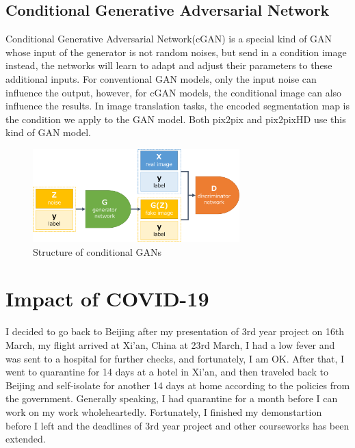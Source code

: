 \subsection{Conditional Generative Adversarial Network}
Conditional Generative Adversarial Network(cGAN) is a special kind of GAN whose input 
of the generator is not random noises, but send in a condition image instead, the networks will learn 
to adapt and adjust their parameters to these additional inputs. For conventional GAN models, 
only the input noise can influence the output, however, for cGAN models, the conditional image can 
also influence the results. In image translation tasks, the encoded segmentation map is the condition 
we apply to the GAN model. Both pix2pix\cite{pix2pix2016} and pix2pixHD\cite{wang2018pix2pixHD} use 
this kind of GAN model.
\begin{figure}[H]
    \begin{center}
    \includegraphics[width=8cm]{figures/cGANs}
    \end{center}
    \caption{Structure of conditional GANs}
    \label{fig:cGANs-structure}
\end{figure}

\section{Impact of COVID-19}
I decided to go back to Beijing after my presentation of 3rd year project on 16th March, my flight arrived at Xi'an,
China at 23rd March, I had a low fever and was sent to a hospital for further checks, and fortunately, I am OK. 
After that, I went to quarantine for 14 days at a hotel in Xi'an, and then traveled back to Beijing and 
self-isolate for another 14 days at home according to the policies from the government. Generally speaking, I 
had quarantine for a month before I can work on my work wholeheartedly. Fortunately, I finished my demonstartion 
before I left and the deadlines of 3rd year project and other courseworks has been extended.



